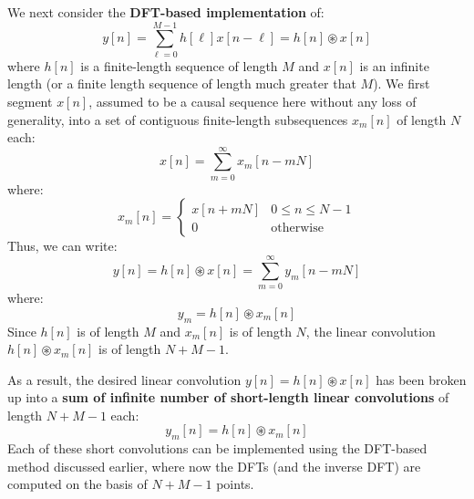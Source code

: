 \documentclass[../../main/main.tex]{subfiles}
\begin{document}
We next consider the \textbf{DFT-based implementation} of:
\begin{equation}
    y[n]
    =
    \sum_{\ell=0}^{M-1} h[\ell] x[n-\ell]
    =
    h[n] \circledast x[n]
    \label{eq:L13_S18_1}
\end{equation}
where \( h[n] \) is a finite-length sequence of length \( M \) and \( x[n] \) is an infinite length (or a finite length sequence of length much greater that \( M \)).
We first segment \( x[n] \), assumed to be a causal sequence here without any loss of generality, into a set of contiguous finite-length subsequences \( x_{m}[n] \) of length \( N \) each:
\begin{equation}
    x[n]
    =
    \sum_{m=0}^{\infty} x_{m}[n-mN]
    \label{eq:L13_S19_1}
\end{equation}
where:
\begin{equation}
    x_{m}[n]
    =
    \begin{cases}
        x[n+mN] &   0 \le n \le N-1 \\
        0       &   \text{otherwise}
    \end{cases}
    \label{eq:L13_S19_2}
\end{equation}
Thus, we can write:
\begin{equation}
    y[n]
    =
    h[n] \circledast x[n]
    =
    \sum_{m=0}^{\infty} y_{m}[n-mN]
    \label{eq:L13_S20_1}
\end{equation}
where:
\begin{equation}
    y_{m}
    =
    h[n] \circledast x_{m}[n]
    \label{eq:L13_S20_2}
\end{equation}
Since \( h[n] \) is of length \( M \) and \( x_{m}[n] \) is of length \( N \), the linear convolution \( h[n] \circledast x_{m}[n] \) is of length \( N + M - 1 \).

As a result, the desired linear convolution \( y[n] = h[n] \circledast x[n] \) has been broken up into a \textbf{sum of infinite number of short-length linear convolutions} of length \( N + M - 1 \) each:
\begin{equation}
    y_{m}[n]
    =
    h[n] \circledast x_{m}[n]
    \label{eq:L13_S21_1}
\end{equation}
Each of these short convolutions can be implemented using the DFT-based method discussed earlier, where now the DFTs (and the inverse DFT) are computed on the basis of \( N + M - 1 \) points.
\end{document}
